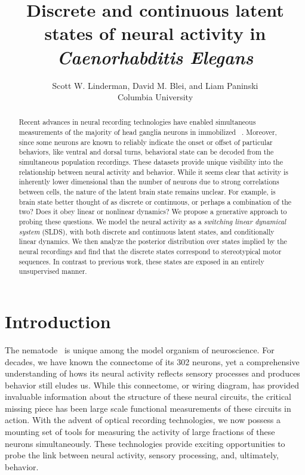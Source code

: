 \documentclass{article}
\title{Discrete and continuous latent states of neural activity in \textit{Caenorhabditis Elegans}}
\author{Scott W. Linderman,
  David M. Blei,
  and
  Liam Paninski \\
  Columbia University
}
\begin{document}
\singlespacing
\maketitle

\begin{abstract}
  Recent advances in neural recording technologies have enabled
  simultaneous measurements of the majority of head ganglia neurons in
  immobilized \celegans~\citep{kato2015global}. Moreover, since some
  neurons are known to reliably indicate the onset or offset of
  particular behaviors, like ventral and dorsal turns, behavioral
  state can be decoded from the simultaneous population recordings.
  These datasets provide unique visibility into the relationship
  between neural activity and behavior.  While it seems clear that
  activity is inherently lower dimensional than the number of neurons
  due to strong correlations between cells, the nature of the latent brain state
  remains unclear. For example, is brain state better thought of as
  discrete or continuous, or perhaps a combination of the two? Does it
  obey linear or nonlinear dynamics?  We propose a generative approach
  to probing these questions. We model the neural activity as a
  \emph{switching linear dynamical system} (SLDS), with both discrete
  and continuous latent states, and conditionally linear dynamics.  We
  then analyze the posterior distribution over states implied by the
  neural recordings and find that the discrete states correspond to
  stereotypical motor sequences. In contrast to previous work, these
  states are exposed in an entirely unsupervised manner.
\end{abstract}

\onehalfspacing

\section{Introduction}
The nematode \celegans~is unique among the model organism of
neuroscience. For decades, we have known the connectome of its 302
neurons, yet a comprehensive understanding of hows its neural activity
reflects sensory processes and produces behavior still eludes
us. While this connectome, or wiring diagram, has provided invaluable
information about the structure of these neural circuits, the critical
missing piece has been large scale functional measurements of these
circuits in action. With the advent of optical recording technologies,
we now possess a mounting set of tools for measuring the activity of large
fractions of these neurons simultaneously. These technologies provide
exciting opportunities to probe the link between neural activity,
sensory processing, and, ultimately, behavior.
\end{document}
